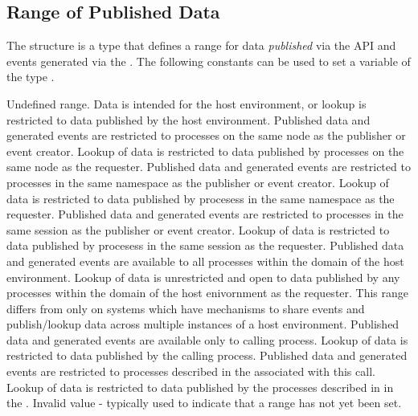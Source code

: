 \subsection{Range of Published Data}

The  structure is a  type that defines a range for data \textit{published} via the  \ac{API} and events generated via the .
The following constants can be used to set a variable of the type .

\begin{constantdesc}
%
Undefined range.
%
Data is intended for the host environment, or lookup is restricted to data published by the host environment.
%
Published data and generated events are restricted to processes on the same node as the publisher or event creator.  Lookup of data is restricted to data published by processes on the same node as the requester.
%
Published data and generated events are restricted to processes in the same namespace as the publisher or event creator.
Lookup of data is restricted to data published by procesess in the same namespace as the requester.
%
Published data and generated events are restricted to processes in the same session as the publisher or event creator.
Lookup of data is restricted to data published by procesess in the same session as the requester.
%
Published data and generated events are available to all processes within the domain of the host environment.
Lookup of data is unrestricted and open to data published by any processes within the domain of the host enivornment as the requester.  This range differs from  only on systems which have mechanisms to share events and
publish/lookup data across multiple instances of a host environment.
%
Published data and generated events are available only to calling process.
Lookup of data is restricted to data published by the calling process.
%
Published data and generated events are restricted to processes
described in the  associated with this call.
Lookup of data is restricted to data published by the processes described in
in the .
%
Invalid value - typically used to indicate that a range has not yet been set.
%
\end{constantdesc}


